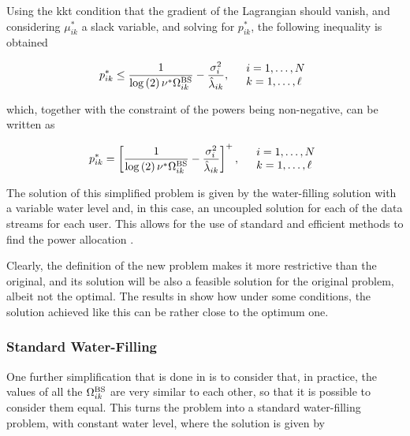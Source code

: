 Using the \gls{kkt} condition that the gradient of the Lagrangian should vanish,
and considering $\mu_{ik}^\ast$ a slack variable, and solving for $p_{ik}^\ast$,
the following inequality is obtained

\begin{equation} \label{eq:modified_wf_gradient_ineq}
    p_{ik}^\ast \leq \frac{1}{\log\left(2\right)\nu^\ast\Omega_{ik}^{\text{BS}}} -
    \frac{\sigma_i^2}{\hat{\lambda}_{ik}}, \quad 
	\begin{array}{l}
        i = 1, \ldots, N\\
        k = 1, \ldots, \ell
	\end{array}
\end{equation}

\noindent
which, together with the constraint of the powers being non-negative, can be
written as

\begin{equation} \label{eq:mwf}
    p_{ik}^\ast = \left[\frac{1}{\log\left(2\right)\nu^\ast\Omega_{ik}^{\text{BS}}} - 
    \frac{\sigma_i^2}{\hat{\lambda}_{ik}}\right]^+, \quad 
	\begin{array}{l}
        i = 1, \ldots, N\\
        k = 1, \ldots, \ell
	\end{array}
\end{equation}

The solution of this simplified problem is given by the water-filling solution
with a variable water level and, in this case, an uncoupled solution for each of
the data streams for each user. This allows for the use of standard and
efficient methods to find the power allocation \cite{cioffi_notes}.

Clearly, the definition of the new problem makes it more restrictive than the
original, and its solution will be also a feasible solution for the original
problem, albeit not the optimal. The results in \cite{armada11b} show how under
some conditions, the solution achieved like this can be rather close to the
optimum one.

\subsubsection{Standard Water-Filling}\label{sssec:standard_wf}

One further simplification that is done in \cite{armada11b} is to consider that,
in practice, the values of all the $\Omega_{ik}^{\text{BS}}$ are very similar to each other, so
that it is possible to consider them equal. This turns the problem into a
standard water-filling problem, with constant water level, where the solution is
given by

